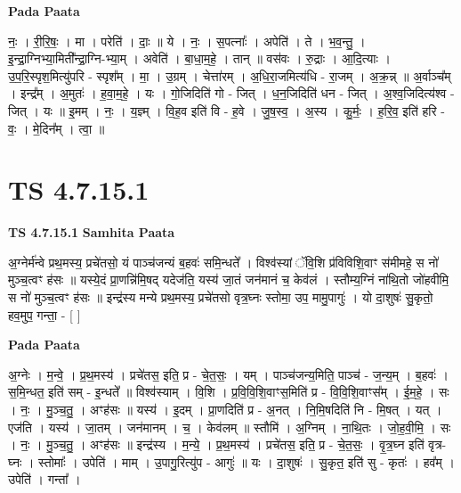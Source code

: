 \documentclass[17pt]{extarticle}
\begin{document}
\textbf{Pada Paata} \newline

नः॒ । री॒रि॒षः॒ । मा । परेति॑ । दाः॒ ॥ ये । नः॒ । स॒पत्नाः᳚ । अपेति॑ । ते । भ॒व॒न्तु॒ । इ॒न्द्रा॒ग्निभ्या॒मिती᳚न्द्रा॒ग्नि-भ्या॒म् । अवेति॑ । बा॒धा॒म॒हे॒ । तान् ॥ वस॑वः । रु॒द्राः । आ॒दि॒त्याः । उ॒प॒रि॒स्पृश॒मित्यु॑परि - स्पृश᳚म् । मा॒ । उ॒ग्रम् । चेत्ता॑रम् । अ॒धि॒रा॒जमित्य॑धि - रा॒जम् । अ॒क्र॒न्न् ॥ अ॒र्वाञ्च᳚म् । इन्द्र᳚म् । अ॒मुतः॑ । ह॒वा॒म॒हे॒ । यः । गो॒जिदिति॑ गो - जित् । ध॒न॒जिदिति॑ धन - जित् । अ॒श्व॒जिदित्य॑श्व - जित् । यः ॥ इ॒मम् । नः॒ । य॒ज्ञ्म् । वि॒ह॒व इति॑ वि - ह॒वे । जु॒ष॒स्व॒ । अ॒स्य । कु॒र्मः॒ । ह॒रि॒व॒ इति॑ हरि - वः॒ । मे॒दिन᳚म् । त्वा॒ ॥  \newline





\section{ TS 4.7.15.1 }

\textbf{TS 4.7.15.1 } \newline
\textbf{Samhita Paata} \newline

अ॒ग्नेर्म॑न्वे प्रथ॒मस्य॒ प्रचे॑तसो॒ यं पाञ्च॑जन्यं ब॒हवः॑ समि॒न्धते᳚ । विश्व॑स्यां ॅवि॒शि प्र॑विविशि॒वाꣳ स॑मीमहे॒ स नो॑ मुञ्च॒त्वꣳ ह॑सः ॥ यस्ये॒दं प्रा॒णन्नि॑मि॒षद् यदेज॑ति॒ यस्य॑ जा॒तं जन॑मानं च॒ केव॑लं । स्तौम्य॒ग्निं ना॑थि॒तो जो॑हवीमि॒ स नो॑ मुञ्च॒त्वꣳ ह॑सः ॥ इन्द्र॑स्य मन्ये प्रथ॒मस्य॒ प्रचे॑तसो वृत्र॒घ्नः स्तोमा॒ उप॒ मामु॒पागुः॑ । यो दा॒शुषः॑ सु॒कृतो॒ हव॒मुप॒ गन्ता॒ - [  ] \newline

\textbf{Pada Paata} \newline

अ॒ग्नेः । म॒न्वे॒ । प्र॒थ॒मस्य॑ । प्रचे॑तस॒ इति॒ प्र - चे॒त॒सः॒ । यम् । पाञ्च॑जन्य॒मिति॒ पाञ्च॑ - ज॒न्य॒म् । ब॒हवः॑ । स॒मि॒न्धत॒ इति॑ सम् - इ॒न्धते᳚ ॥ विश्व॑स्याम् । वि॒शि । प्र॒वि॒वि॒शि॒वाꣳस॒मिति॑ प्र - वि॒वि॒शि॒वाꣳस᳚म् । ई॒म॒हे॒ । सः । नः॒ । मु॒ञ्च॒तु॒ । अꣳह॑सः ॥ यस्य॑ । इ॒दम् । प्रा॒णदिति॑ प्र - अ॒नत् । नि॒मि॒षदिति॑ नि - मि॒षत् । यत् । एज॑ति । यस्य॑ । जा॒तम् । जन॑मानम् । च॒ । केव॑लम् ॥ स्तौमि॑ । अ॒ग्निम् । ना॒थि॒तः । जो॒ह॒वी॒मि॒ । सः । नः॒ । मु॒ञ्च॒तु॒ । अꣳह॑सः ॥ इन्द्र॑स्य । म॒न्ये॒ । प्र॒थ॒मस्य॑ । प्रचे॑तस॒ इति॒ प्र - चे॒त॒सः॒ । वृ॒त्र॒घ्न इति॑ वृत्र-घ्नः । स्तोमाः᳚ । उपेति॑ । माम् । उ॒पागु॒रित्यु॑प - आगुः॑ ॥ यः । दा॒शुषः॑ । सु॒कृत॒ इति॑ सु - कृतः॑ । हव᳚म् । उपेति॑ । गन्ता᳚ ।  \newline
\end{document}
